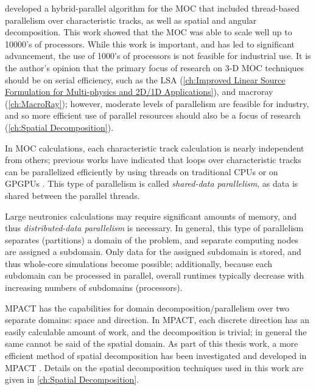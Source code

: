 {{        \citet{Kochunas2013} developed a hybrid-parallel algorithm for the \ac{MOC} that included thread-based parallelism over characteristic tracks, as well as spatial and angular decomposition.
        This work showed that the \ac{MOC} was able to scale well up to 10000's of processors.
        While this work is important, and has led to significant advancement, the use of 1000's of processors is not feasible for industrial use.
        It is the author's opinion that the primary focus of research on 3-D \ac{MOC} techniques should be on serial efficiency, such as the \acf{LSA} (\cref{ch:Improved Linear Source Formulation for Multi-physics and 2D/1D Applications}), and macroray (\cref{ch:MacroRay});
        however, moderate levels of parallelism are feasible for industry, and so more efficient use of parallel resources should also be a focus of research (\cref{ch:Spatial Decomposition}).

        In \ac{MOC} calculations, each characteristic track calculation is nearly independent from others; previous works have indicated that loops over characteristic tracks can be parallelized efficiently by using threads on traditional \acp{CPU} \cite{Kochunas2013} or on \acp{GPGPU} \cite{Boyd2014}.
        This type of parallelism is called \emph{shared-data parallelism}, as data is shared between the parallel threads.

        Large neutronics calculations may require significant amounts of memory, and thus \emph{distributed-data parallelism} is necessary.
        In general, this type of parallelism separates (partitions) a domain of the problem, and separate computing nodes are assigned a subdomain.
        Only data for the assigned subdomain is stored, and thus whole-core simulations become possible; additionally, because each subdomain can be processed in parallel, overall runtimes typically decrease with increasing numbers of subdomains (processors).

        MPACT has the capabilities for domain decomposition/parallelism over two separate domains: space and direction.
        In MPACT, each discrete direction has an easily calculable amount of work, and the decomposition is trivial; in general the same cannot be said of the spatial domain.
        As part of this thesis work, a more efficient method of spatial decomposition has been investigated and developed in MPACT \cite{Fitzgerald2019a}.
        Details on the spatial decomposition techniques used in this work are given in \cref{ch:Spatial Decomposition}.
    }

    \printbibliography
}